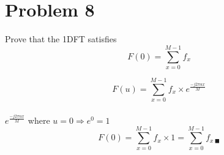 \documentclass[12pt]{article}
\begin{document}
     \section{Problem 8}
     Prove that the 1DFT satisfies
     $$F(0)= \sum_{x=0}^{M-1}f_{x}$$

    $$F(u)= \sum_{x=0}^{M-1}f_{x} \times e^{\frac{-j2\pi ux}{M} }$$\\
    $e^{ \frac{-j2\pi ux}{M} }$ where $u=0 \Rightarrow  e^{0}=1$
    $$F(0)= \sum_{x=0}^{M-1}f_{x} \times 1 = \sum_{x=0}^{M-1}f_{x \ \blacksquare}  $$
\end{document}
